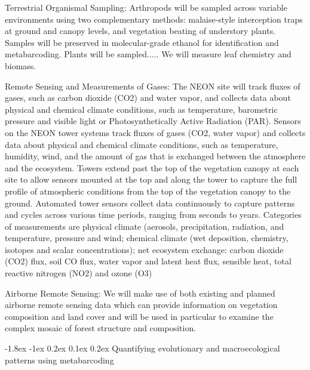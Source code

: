 \documentclass[11pt]{article}
\makeatletter
\renewcommand\subsubsection{\@startsection{subsection}{1}{\z@}%
                                  {-1.8ex \@plus -1ex \@minus 0.2ex}%
                                  {0.1ex \@plus 0.2ex}%
                                  {\normalfont\bfseries}}
\makeatother
\begin{document}
Terrestrial Organismal Sampling: Arthropods will be sampled across variable environments using two complementary methods: malaise-style interception traps at ground and canopy levels, and vegetation beating of understory plants. Samples will be preserved in molecular-grade ethanol for identification and metabarcoding. Plants will be sampled.....  We will measure leaf chemistry and biomass.

Remote Sensing and Measurements of Gases: The NEON site will track fluxes of gases, such as carbon dioxide (CO2) and water vapor, and collects data about physical and chemical climate conditions, such as temperature, barometric pressure and visible light or Photosynthetically Active Radiation (PAR). Sensors on the NEON tower systems track fluxes of gases (CO2, water vapor) and collects data about physical and chemical climate conditions, such as temperature, humidity, wind, and the amount of gas that is exchanged between the atmosphere and the ecosystem. Towers extend past the top of the vegetation canopy at each site to allow sensors mounted at the top and along the tower to capture the full profile of atmospheric conditions from the top of the vegetation canopy to the ground. Automated tower sensors collect data continuously to capture patterns and cycles across various time periods, ranging from seconds to years. Categories of measurements are physical climate (aerosols, precipitation, radiation, and temperature, pressure and wind; chemical climate (wet deposition, chemistry, isotopes and scalar concentrations); net ecosystem exchange: carbon dioxide (CO2) flux, soil CO flux, water vapor and latent heat flux, sensible heat, total reactive nitrogen (NO2) and ozone (O3)

Airborne Remote Sensing: We will make use of both existing and planned airborne remote sensing data which can provide information on vegetation composition and land cover and will be used in particular to examine the complex mosaic of forest structure and composition.



\subsubsection{Quantifying evolutionary and macroecological patterns using metabarcoding}
\end{document}
